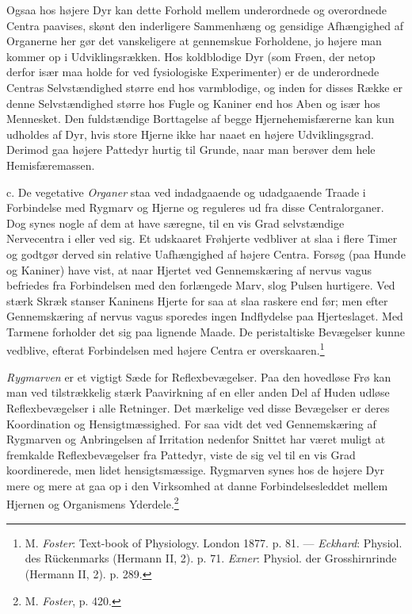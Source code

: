 \documentclass[12pt,a4paper,openany]{book}
\newcommand{\opage}[1]{\marginnote{\footnotesize\textit{[#1]}}}
\begin{document}
Ogsaa hos højere Dyr kan dette Forhold mellem underordnede og
overordnede Centra paavises, skønt den inderligere Sammenhæng og
gensidige Afhængighed af Organerne her gør det vanskeligere at
gennemskue Forholdene, jo højere man kommer op i Udviklingsrækken. Hos
koldblodige Dyr (som Frøen, der netop derfor især maa holde for ved
fysiologiske Experimenter) er de underordnede Centras Selvstændighed
større end hos varmblodige, og inden for disses Række er denne
Selvstændighed større hos Fugle og Kaniner end hos Aben og især hos
Mennesket. Den fuldstændige Borttagelse af begge Hjernehemisfærerne kan
kun udholdes af Dyr, hvis store Hjerne ikke har naaet en højere
Udviklingsgrad. Derimod
\opage{47}gaa højere Pattedyr hurtig til Grunde, naar man berøver dem
hele Hemisfæremassen.

c. De vegetative \emph{Organer} staa ved indadgaaende og udadgaaende
Traade i Forbindelse med Rygmarv og Hjerne og reguleres ud fra disse
Centralorganer. Dog synes nogle af dem at have særegne, til en vis Grad
selvstændige Nervecentra i eller ved sig. Et udskaaret Frøhjerte
vedbliver at slaa i flere Timer og godtgør derved sin relative
Uafhængighed af højere Centra. Forsøg (paa Hunde og Kaniner) have vist,
at naar Hjertet ved Gennemskæring af nervus vagus befriedes fra
Forbindelsen med den forlængede Marv, slog Pulsen hurtigere. Ved stærk
Skræk stanser Kaninens Hjerte for saa at slaa raskere end før; men efter
Gennemskæring af nervus vagus sporedes ingen Indflydelse paa
Hjerteslaget. Med Tarmene forholder det sig paa lignende Maade. De
peristaltiske Bevægelser kunne vedblive, efterat Forbindelsen med højere
Centra er overskaaren.\footnote[1]{M. \emph{Foster}: Text-book of
Physiology. London 1877. p. 81. --- \emph{Eckhard}: Physiol. des
Rückenmarks (Hermann II, 2). p. 71. \emph{Exner}: Physiol. der
Grosshirnrinde (Hermann II, 2). p. 289.}

\emph{Rygmarven} er et vigtigt Sæde for Reflexbevægelser. Paa den
hovedløse Frø kan man ved tilstrækkelig stærk Paavirkning af en eller
anden Del af Huden udløse Reflexbevægelser i alle Retninger. Det
mærkelige ved disse Bevægelser er deres Koordination og
Hensigtmæssighed. For saa vidt det ved Gennemskæring af Rygmarven og
Anbringelsen af Irritation nedenfor Snittet har været muligt at
fremkalde Reflexbevægelser fra Pattedyr, viste de sig vel til en vis
Grad koordinerede, men lidet hensigtsmæssige. Rygmarven synes hos de
højere Dyr mere og mere at gaa op i den Virksomhed at danne
Forbindelsesleddet mellem Hjernen og Organismens
Yderdele.\footnote[2]{M. \emph{Foster}, p. 420.}
\end{document}
